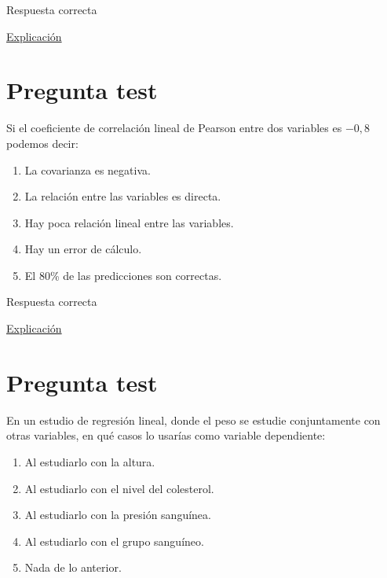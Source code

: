 \documentclass[
]{book}
\providecommand{\tightlist}{%
  \setlength{\itemsep}{0pt}\setlength{\parskip}{0pt}}
\begin{document}
Respuesta correcta

\href{https://smiba.org.ar/curso_medico_especialista/lecturas_2021/e\%29.\%204\%20Correlación\%20y\%20regresión.pdf}{Explicación}

\hypertarget{pregunta-test-127}{%
\section{Pregunta test}\label{pregunta-test-127}}

Si el coeficiente de correlación lineal de Pearson entre dos variables es \(-0,8\) podemos decir:

\begin{enumerate}
\def\labelenumi{\alph{enumi})}
\tightlist
\item
  La covarianza es negativa.
\item
  La relación entre las variables es directa.
\item
  Hay poca relación lineal entre las variables.
\item
  Hay un error de cálculo.
\item
  El 80\% de las predicciones son correctas.
\end{enumerate}

Respuesta correcta

\href{https://1fjmanzano.github.io/bioestadistica/relaci\%C3\%B3n-entre-variables-nume\%CC\%81ricas.html\#coeficiente-de-correlacio\%CC\%81n}{Explicación}

\hypertarget{pregunta-test-128}{%
\section{Pregunta test}\label{pregunta-test-128}}

En un estudio de regresión lineal, donde el peso se estudie conjuntamente con otras variables, en qué casos lo usarías como variable dependiente:

\begin{enumerate}
\def\labelenumi{\alph{enumi})}
\tightlist
\item
  Al estudiarlo con la altura.
\item
  Al estudiarlo con el nivel del colesterol.
\item
  Al estudiarlo con la presión sanguínea.
\item
  Al estudiarlo con el grupo sanguíneo.
\item
  Nada de lo anterior.
\end{enumerate}
\end{document}
